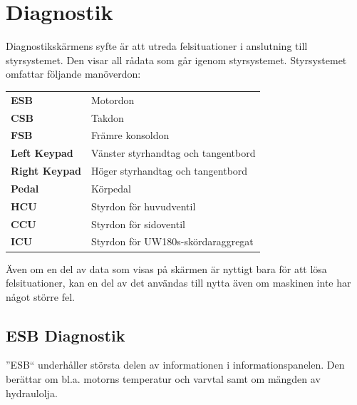 \documentclass[12pt,a4paper,finnish]{uvmanual}
\begin{document}


\section{Diagnostik}\label{ch:system_diagnostics}

Diagnostikskärmens syfte är att utreda felsituationer i anslutning till styrsystemet. Den visar all rådata som går igenom styrsystemet. Styrsystemet omfattar följande manöverdon:

\begin{tabular}{ L{0.2\textwidth} L{0.66\textwidth} }
\textbf{ESB} & Motordon \\
\textbf{CSB} & Takdon \\
\textbf{FSB} & Främre konsoldon \\
\textbf{Left Keypad} & Vänster styrhandtag och tangentbord \\
\textbf{Right Keypad} & Höger styrhandtag och tangentbord \\
\textbf{Pedal} & Körpedal \\
\textbf{HCU} & Styrdon för huvudventil \\
\textbf{CCU} & Styrdon för sidoventil \\
\textbf{ICU} & Styrdon för UW180s-skördaraggregat  \\
\end{tabular}




Även om en del av data som visas på skärmen är nyttigt bara för att lösa felsituationer, kan en del av det användas till nytta även om maskinen inte har något större fel.

\FloatBarrier
\subsection{ESB Diagnostik}\label{ch:system_diagnostics_msb}


''ESB`` underhåller största delen av informationen i informationspanelen. Den berättar om bl.a. motorns temperatur och varvtal samt om mängden av hydraulolja.
\end{document}
